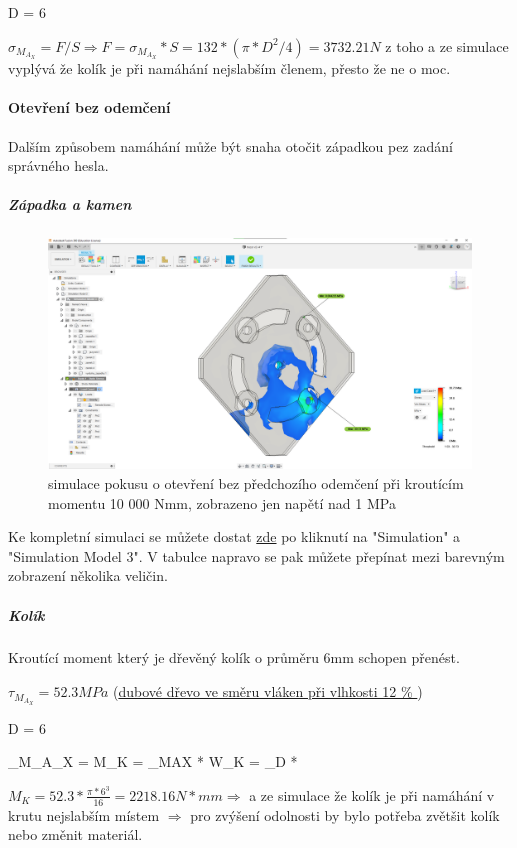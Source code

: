 D = 6

\(\sigma _M_A_X = F/S \Rightarrow F = \sigma _M_A_X * S = 132 * (\pi * D^2/4) = 3 732.21 N \) z toho a ze simulace vyplývá že kolík je při namáhání nejslabším členem, přesto že ne o moc.

\paragraph{Otevření bez odemčení}
Dalším způsobem namáhání může být snaha otočit západkou pez zadání správného hesla.

\subparagraph{Západka a kamen}

\begin{figure}[htbp]
    \centering
    \includegraphics[width=\textwidth]{kapitoly/obrazky/M3/simulace/odolnost_proti_nasilnemu_odemceni_10Nm.png}
    \caption{simulace pokusu o otevření bez předchozího odemčení při kroutícím momentu 10 000 Nmm, zobrazeno jen napětí nad 1 MPa}
    \label{fig:M3-simulace-vytrzeni}
\end{figure}

Ke kompletní simulaci se můžete dostat \href{https://myhub.autodesk360.com/ue2d7aa41/g/shares/SH56a43QTfd62c1cd96843f1e03a0eb48053?viewState=NoIgbgDAdAjCA0IDeAdEAXAngBwKZoC40BlASwFsBXAGwEN1SB7AOzXjVoGdPd1C0ARjABsATlEQItALQBjcbmkAWCMIjSBuWgA5lAM22ilAVgAmMAOyy9%2BBGkYCAVrlnoAkqcIBmAL4gAukA}{zde}
po kliknutí na "Simulation" a "Simulation Model 3". V tabulce napravo se pak můžete přepínat mezi barevným zobrazení několika veličin.

\subparagraph{Kolík}
Kroutící moment který je dřevěný kolík o průměru 6mm schopen přenést. 

\(\tau _M_A_X = 52.3 MPa\)    (\href{https://is.mendelu.cz/eknihovna/opory/zobraz_cast.pl?fit_w=1;cast=9190}{dubové dřevo ve směru vláken při vlhkosti 12 \% })

D = 6

\tau _M_A_X =  \Rightarrow M_K = \tau _MAX * W_K = \sigma _D *  

\(M_K = 52.3 * \frac{\pi * 6^3}{16} = 2 218.16 N*mm \Rightarrow\) a ze simulace že kolík je při namáhání v krutu nejslabším místem \(\Rightarrow\) pro zvýšení odolnosti by bylo 
potřeba zvětšit kolík nebo změnit materiál.